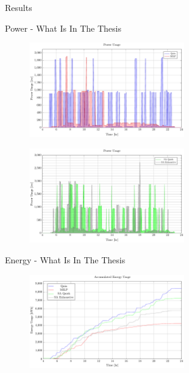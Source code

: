 \documentclass[aspectratio=169]{beamer}
\begin{document}
\begin{frame}[label={sec:org4ee59dd}]{Results}
\begin{frame}[label={sec:org377c964}]{Power - What Is In The Thesis}
\begin{figure}[htpb]
\centering
    \includegraphics[width=0.6\textwidth]{img/sa-pap-paper-bad/power-milp-qin}
\end{figure}
\begin{figure}[htpb]
\centering
    \includegraphics[width=0.6\textwidth]{img/sa-pap-paper-bad/power-sa}
\end{figure}
\end{frame}
\begin{frame}[label={sec:orge33128d}]{Energy - What Is In The Thesis}
\begin{figure}[htpb]
\centering
    \includegraphics[width=0.6\textwidth]{img/sa-pap-paper-bad/energy}
\end{figure}
\end{frame}


\end{frame}
\end{document}
